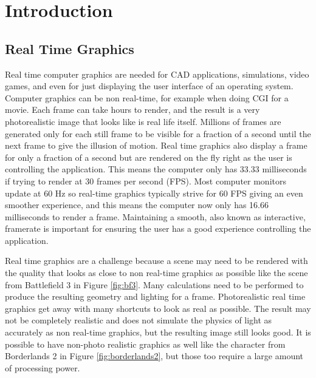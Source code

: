 \documentclass[12pt]{ucthesis}
\begin{document}
\pagestyle{plain}




\renewcommand{\baselinestretch}{1.66}







\chapter{Introduction}
\label{intro}

\section{Real Time Graphics}
\label{real-time-graphics}

Real time computer graphics are needed for CAD applications, simulations, video games, and even for just displaying the user interface of an operating system.
Computer graphics can be non real-time, for example when doing CGI for a movie.
Each frame can take hours to render, and the result is a very photorealistic image that looks like is real life itself.
Millions of frames are generated only for each still frame to be visible for a fraction of a second until the next frame to give the illusion of motion.
Real time graphics also display a frame for only a fraction of a second but are rendered on the fly right as the user is controlling the application.
This means the computer only has 33.33 milliseconds if trying to render at 30 frames per second (FPS).
Most computer monitors update at 60 Hz so real-time graphics typically strive for 60 FPS giving an even smoother experience, and this means the computer now only has 16.66 milliseconds to render a frame.
Maintaining a smooth, also known as interactive, framerate is important for ensuring the user has a good experience controlling the application.\cite{Interactive}

Real time graphics are a challenge because a scene may need to be rendered with the quality that looks as close to non real-time graphics as possible like the scene from Battlefield 3 in Figure \ref{fig:bf3}.
Many calculations need to be performed to produce the resulting geometry and lighting for a frame.
Photorealistic real time graphics get away with many shortcuts to look as real as possible.
The result may not be completely realistic and does not simulate the physics of light as accurately as non real-time graphics, but the resulting image still looks good.
It is possible to have non-photo realistic graphics as well like the character from Borderlands 2 in Figure \ref{fig:borderlands2}, but those too require a large amount of processing power.
\end{document}
